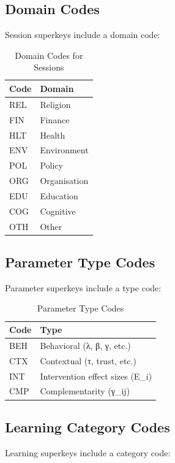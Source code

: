 \subsection{Domain Codes}

Session superkeys include a domain code:

\begin{table}[htbp]
\centering
\caption{Domain Codes for Sessions}
\label{tab:domain-codes}
\begin{tabular}{@{}ll@{}}
\toprule
\textbf{Code} & \textbf{Domain} \\
\midrule
REL & Religion \\
FIN & Finance \\
HLT & Health \\
ENV & Environment \\
POL & Policy \\
ORG & Organisation \\
EDU & Education \\
COG & Cognitive \\
OTH & Other \\
\bottomrule
\end{tabular}
\end{table}

\subsection{Parameter Type Codes}

Parameter superkeys include a type code:

\begin{table}[htbp]
\centering
\caption{Parameter Type Codes}
\label{tab:param-codes}
\begin{tabular}{@{}ll@{}}
\toprule
\textbf{Code} & \textbf{Type} \\
\midrule
BEH & Behavioral (λ, β, γ, etc.) \\
CTX & Contextual (τ, trust, etc.) \\
INT & Intervention effect sizes (E\_i) \\
CMP & Complementarity (γ\_ij) \\
\bottomrule
\end{tabular}
\end{table}

\subsection{Learning Category Codes}

Learning superkeys include a category code:

